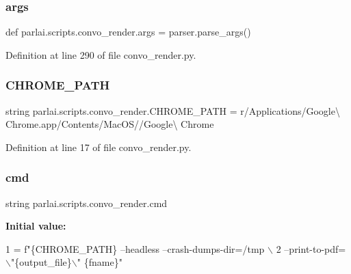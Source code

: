 \subsubsection{\texorpdfstring{args}{args}}
{\footnotesize\ttfamily def parlai.\+scripts.\+convo\+\_\+render.\+args = parser.\+parse\+\_\+args()}



Definition at line 290 of file convo\+\_\+render.\+py.

\mbox{\label{namespaceparlai_1_1scripts_1_1convo__render_ab47b0a7a9443c72696d260ad5e6ac747}} 
\subsubsection{\texorpdfstring{C\+H\+R\+O\+M\+E\+\_\+\+P\+A\+TH}{CHROME\_PATH}}
{\footnotesize\ttfamily string parlai.\+scripts.\+convo\+\_\+render.\+C\+H\+R\+O\+M\+E\+\_\+\+P\+A\+TH = r\textquotesingle{}/Applications/Google\textbackslash{} Chrome.\+app/Contents/Mac\+OS//Google\textbackslash{} Chrome\textquotesingle{}}



Definition at line 17 of file convo\+\_\+render.\+py.

\mbox{\label{namespaceparlai_1_1scripts_1_1convo__render_a6fdef78374ed4101104137135c6764a7}} 
\subsubsection{\texorpdfstring{cmd}{cmd}}
{\footnotesize\ttfamily string parlai.\+scripts.\+convo\+\_\+render.\+cmd}

{\bfseries Initial value\+:}
\begin{DoxyCode}
1 =  f\textcolor{stringliteral}{"\{CHROME\_PATH\} --headless --crash-dumps-dir=/tmp \(\backslash\)}
2 \textcolor{stringliteral}{                     --print-to-pdf=\(\backslash\)"\{output\_file\}\(\backslash\)" \{fname\}"}
\end{DoxyCode}


